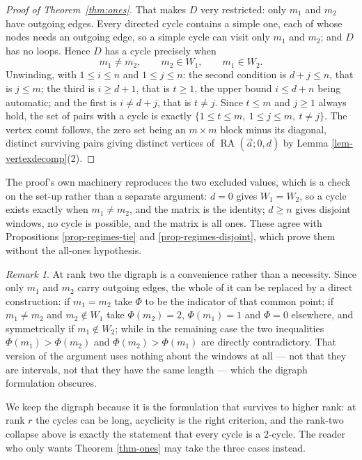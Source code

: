 \documentclass[11pt, a4paper, abstract=yes]{scrartcl}
\theoremstyle{definition}
\theoremstyle{remark}
\newtheorem{remark}[definition]{Remark}
\theoremstyle{plain}
\newcommand{\RA}{\operatorname{RA}}
\begin{document}
\begin{proof}[Proof of Theorem~\ref{thm:ones}]
That makes \(D\) very restricted: only \(m_1\) and \(m_2\) have outgoing
edges. Every directed cycle contains a simple one, each of whose nodes needs an outgoing edge, so
a simple cycle can visit only \(m_1\) and \(m_2\); and \(D\) has no loops. Hence \(D\) has a cycle
precisely when
\begin{equation}\label{eq:no-support-functions-6}
  m_1\ne m_2,\qquad m_2\in W_1,\qquad m_1\in W_2 .
\end{equation}
Unwinding, with \(1\le i\le n\) and \(1\le j\le n\): the second condition is \(d+j\le n\), that is
\(j\le m\); the third is \(i\ge d+1\), that is \(t\ge1\), the upper bound \(i\le d+n\) being
automatic; and the first is \(i\ne d+j\), that is \(t\ne j\). Since \(t\le m\) and \(j\ge1\) always
hold, the set of pairs with a cycle is exactly \(\lbrace 1\le t\le m,\ 1\le j\le m,\ t\ne j\rbrace\).
The vertex count follows, the zero set being an \(m\times m\) block minus its diagonal, distinct
surviving pairs giving distinct vertices of \(\RA(\vec a;0,d)\) by Lemma \ref{lem-vertexdecomp}(2).
\end{proof}

The proof's own machinery reproduces the two excluded values, which is a check on the set-up rather
than a separate argument: \(d=0\) gives \(W_1=W_2\), so a cycle exists exactly when \(m_1\ne m_2\),
and the matrix is the identity; \(d\ge n\) gives disjoint windows, no cycle is possible, and the
matrix is all ones. These agree with Propositions \ref{prop-regimes-tie} and
\ref{prop-regimes-disjoint}, which prove them without the all-ones hypothesis.

\begin{remark}
At rank two the digraph is a convenience rather than a necessity. Since only \(m_1\) and \(m_2\)
carry outgoing edges, the whole of it can be replaced by a direct construction: if \(m_1=m_2\) take
\(\Phi\) to be the indicator of that common point; if \(m_1\ne m_2\) and \(m_2\notin W_1\) take
\(\Phi(m_2)=2\), \(\Phi(m_1)=1\) and \(\Phi=0\) elsewhere, and symmetrically if \(m_1\notin W_2\);
while in the remaining case the two inequalities \(\Phi(m_1)>\Phi(m_2)\) and \(\Phi(m_2)>\Phi(m_1)\)
are directly contradictory. That version of the argument uses nothing about the windows at all ---
not that they are intervals, not that they have the same length --- which the digraph formulation
obscures.

We keep the digraph because it is the formulation that survives to higher rank: at rank \(r\) the
cycles can be long, acyclicity is the right criterion, and the rank-two collapse above is exactly
the statement that every cycle is a \(2\)-cycle. The reader who only wants Theorem \ref{thm-ones}
may take the three cases instead.
\label{rem:digraph-collapses}
\label{rem-digraph-collapses}
\end{remark}
\end{document}
